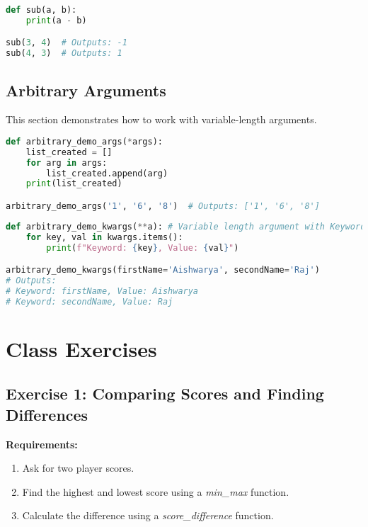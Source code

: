 \documentclass{article}
\begin{document}
\begin{lstlisting}[language=Python, caption={Positional Arguments}]
def sub(a, b):
    print(a - b)

sub(3, 4)  # Outputs: -1
sub(4, 3)  # Outputs: 1
\end{lstlisting}

\subsection{Arbitrary Arguments}
This section demonstrates how to work with variable-length arguments.

\begin{lstlisting}[language=Python, caption={Arbitrary Positional Arguments (*args)}]
def arbitrary_demo_args(*args):
    list_created = []
    for arg in args:
        list_created.append(arg)
    print(list_created)

arbitrary_demo_args('1', '6', '8')  # Outputs: ['1', '6', '8']
\end{lstlisting}

\begin{lstlisting}[language=Python, caption={Arbitrary Keyword Arguments (**kwargs)}]
def arbitrary_demo_kwargs(**a): # Variable length argument with Keyword
    for key, val in kwargs.items():
        print(f"Keyword: {key}, Value: {val}")

arbitrary_demo_kwargs(firstName='Aishwarya', secondName='Raj')
# Outputs:
# Keyword: firstName, Value: Aishwarya
# Keyword: secondName, Value: Raj
\end{lstlisting}
\newpage

\section{Class Exercises}

\subsection{Exercise 1: Comparing Scores and Finding Differences}

\textbf{Requirements:}
\begin{enumerate}
    \item Ask for two player scores.
    \item Find the highest and lowest score using a \textit{min\_max} function.
    \item Calculate the difference using a \textit{score\_difference} function.
\end{enumerate}
\end{document}
